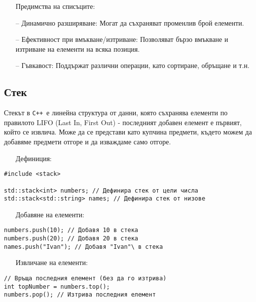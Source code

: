 \documentclass[oneside]{book}
\newcommand*{\cpp}{\texttt{C++}\ }
\begin{document}
\begin{itemize}\item[Предимства] на списъците:\end{itemize}
\begin{itemize}
    \item[--] Динамично разширяване: Могат да съхраняват променлив брой елементи.
    \item[--] Ефективност при вмъкване/изтриване: Позволяват бързо вмъкване и изтриване на елементи на всяка позиция.
    \item[--] Гъвкавост: Поддържат различни операции, като сортиране, обръщане и т.н.
\end{itemize}

\subsection{Стек}
Стекът в \cpp е линейна структура от данни, която съхранява елементи по правилото LIFO (Last In, First Out) - последният добавен елемент е първият, който се извлича. Може да се представи като купчина предмети, където можем да добавяме предмети отгоре и да изваждаме само отгоре.

\begin{itemize}\item[Дефиниция:]\end{itemize}
\begin{mdframed}\begin{lstlisting}
#include <stack>

std::stack<int> numbers; // Дефинира стек от цели числа
std::stack<std::string> names; // Дефинира стек от низове
\end{lstlisting}\end{mdframed}

\begin{itemize}\item[Добавяне] на елементи:\end{itemize}
\begin{mdframed}\begin{lstlisting}
numbers.push(10); // Добавя 10 в стека
numbers.push(20); // Добавя 20 в стека
names.push("Ivan"); // Добавя "Ivan"\ в стека
\end{lstlisting}\end{mdframed}
\pagebreak
\begin{itemize}\item[Извличане] на елементи:\end{itemize}
\begin{mdframed}\begin{lstlisting}
// Връща последния елемент (без да го изтрива)
int topNumber = numbers.top();
numbers.pop(); // Изтрива последния елемент
\end{lstlisting}\end{mdframed}
\end{document}
